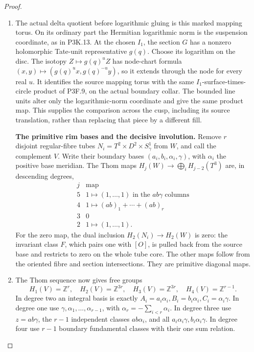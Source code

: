 \begin{proof}
\begin{enumerate}[label=\arabic*.]
\item The actual delta quotient before logarithmic gluing is this marked
mapping torus.  On its ordinary part the Hermitian logarithmic norm
is the suspension coordinate, as in P3K.13.  At the chosen \(I_1\),
the section \(G\) has a nonzero holomorphic Tate-unit representative
\(g(q)\).  Choose its logarithm on the disc.  The isotopy
\(Z\mapsto g(q)^u Z\) has node-chart formula
\((x,y)\mapsto(g(q)^u x,g(q)^{-u}y)\), so it extends through the
node for every real \(u\).  It identifies the source mapping torus
with the same \(I_1\)-surface-times-circle product of P3F.9, on
the actual boundary collar.  The bounded line units alter only the
logarithmic-norm coordinate and give the same product map.  This
supplies the comparison across the cusp, including its source
translation, rather than replacing that piece by a different fill.

\par\medskip\noindent\textbf{The primitive rim bases and the decisive involution.}\enspace
Remove \(r\) disjoint regular-fibre tubes
\(N_i=T^2\times D^2\times S^1_\gamma\) from \(W\), and call
the complement \(V\).  Write their boundary bases
\((a_i,b_i,\alpha_i,\gamma)\), with \(\alpha_i\) the positive
base meridian.  The Thom maps
\(H_j(W)\to\bigoplus_iH_{j-2}(T^3)\) are, in descending degrees,
\[
 \begin{array}{c|c}
 j&\text{map}\\\hline
 5&1\longmapsto(1,\ldots,1)\text{ in the }ab\gamma\text{ columns}\\
 4&1\longmapsto(ab)_1+\cdots+(ab)_r\\
 3&0\\
 2&1\longmapsto(1,\ldots,1).
 \end{array}                                                     \tag{P3K.22.5}
\]
For the zero map, the dual inclusion \(H_2(N_i)\to H_2(W)\)
is zero: the invariant class \(F\), which pairs one with \([O]\),
is pulled back from the source base and restricts to zero on the
whole tube core.  The other maps follow from the oriented fibre and
section intersections.  They are primitive diagonal maps.

\item The Thom sequence now gives free groups
\[
 H_1(V)=\mathbb Z^r,\quad H_2(V)=\mathbb Z^{3r},
 \quad H_3(V)=\mathbb Z^{3r},\quad H_4(V)=\mathbb Z^{r-1}.
\]
In degree two an integral basis is exactly
\(A_i=a_i\alpha_i,B_i=b_i\alpha_i,C_i=\alpha_i\gamma\).
In degree one use \(\gamma,\alpha_1,\ldots,\alpha_{r-1}\), with
\(\alpha_r=-\sum_{i<r}\alpha_i\).  In degree three use
\(z=ab\gamma\), the \(r-1\) independent classes \(ab\alpha_i\),
and all \(a_i\alpha_i\gamma,b_i\alpha_i\gamma\).  In degree four
use \(r-1\) boundary fundamental classes with their one sum relation.


\end{enumerate}
\end{proof}

